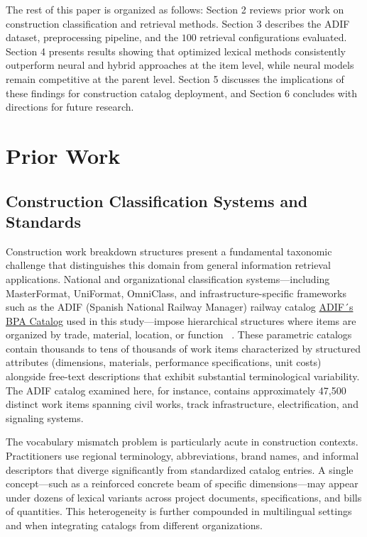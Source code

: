 \documentclass[preprint,12pt]{elsarticle}
\begin{document}
The rest of this paper is organized as follows: Section 2 reviews prior work on construction classification and retrieval methods. Section 3 describes the ADIF dataset, preprocessing pipeline, and the $100$ retrieval configurations evaluated. Section 4 presents results showing that optimized lexical methods consistently outperform neural and hybrid approaches at the item level, while neural models remain competitive at the parent level. Section 5 discusses the implications of these findings for construction catalog deployment, and Section 6 concludes with directions for future research. 

\section{Prior Work}

\subsection{Construction Classification Systems and Standards}

Construction work breakdown structures present a fundamental taxonomic challenge that distinguishes this domain from general information retrieval applications. National and organizational classification systems—including MasterFormat, UniFormat, OmniClass, and infrastructure-specific frameworks such as the ADIF (Spanish National Railway Manager) railway catalog \href{https://bpa.adif.es/bp1/#/welcome}{ADIF´s BPA Catalog} used in this study—impose hierarchical structures where items are organized by trade, material, location, or function ~\cite{royanoAnalysisClassificationSystems2023a, guvenConstructionClassificationSystem2022}. These parametric catalogs contain thousands to tens of thousands of work items characterized by structured attributes (dimensions, materials, performance specifications, unit costs) alongside free-text descriptions that exhibit substantial terminological variability. The ADIF catalog examined here, for instance, contains approximately 47,500 distinct work items spanning civil works, track infrastructure, electrification, and signaling systems.

The vocabulary mismatch problem is particularly acute in construction contexts. Practitioners use regional terminology, abbreviations, brand names, and informal descriptors that diverge significantly from standardized catalog entries. A single concept—such as a reinforced concrete beam of specific dimensions—may appear under dozens of lexical variants across project documents, specifications, and bills of quantities. This heterogeneity is further compounded in multilingual settings and when integrating catalogs from different organizations. 
\end{document}

